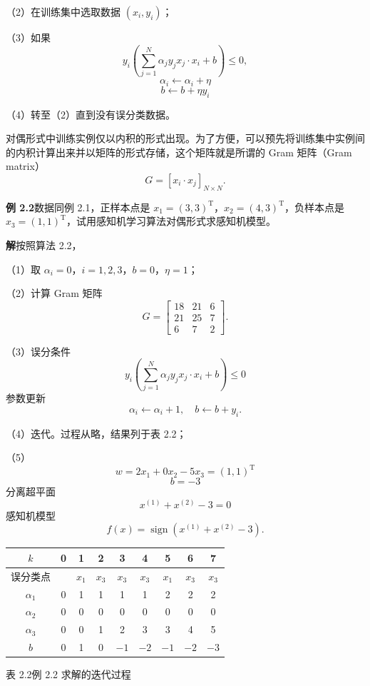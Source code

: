 \documentclass[UTF8, 12pt, fontset=fandol, oneside]{ctexart}
\begin{document}
（2）在训练集中选取数据 $(x_i,y_i)$；

（3）如果
\[
  y_i\left(\sum_{j=1}^N\alpha_jy_jx_j\cdot x_i+b\right)\le 0,
\]
\[
  \alpha_i\leftarrow\alpha_i+\eta
\]
\[
  b\leftarrow b+\eta y_i
\]

（4）转至（2）直到没有误分类数据。

对偶形式中训练实例仅以内积的形式出现。为了方便，可以预先将训练集中实例间的内积计算出来并以矩阵的形式存储，这个矩阵就是所谓的 Gram 矩阵（Gram matrix）
\[
  G=[x_i\cdot x_j]_{N\times N}.
\]

\noindent\textbf{例 2.2}\quad 数据同例 2.1，正样本点是 $x_1=(3,3)^\mathrm{T}$，$x_2=(4,3)^\mathrm{T}$，负样本点是 $x_3=(1,1)^\mathrm{T}$，试用感知机学习算法对偶形式求感知机模型。

\noindent\textbf{解}\quad 按照算法 2.2，

（1）取 $\alpha_i=0$，$i=1,2,3$，$b=0$，$\eta=1$；

（2）计算 Gram 矩阵
\[
  G=
  \begin{bmatrix}
    18 & 21 & 6\\
    21 & 25 & 7\\
    6 & 7 & 2
  \end{bmatrix}.
\]

（3）误分条件
\[
  y_i\left(\sum_{j=1}^N\alpha_jy_jx_j\cdot x_i+b\right)\le 0
\]
参数更新
\[
  \alpha_i\leftarrow\alpha_i+1,\quad b\leftarrow b+y_i.
\]

（4）迭代。过程从略，结果列于表 2.2；

（5）
\[
  w=2x_1+0x_2-5x_3=(1,1)^\mathrm{T}
\]
\[
  b=-3
\]
分离超平面
\[
  x^{(1)}+x^{(2)}-3=0
\]
感知机模型
\[
  f(x)=\operatorname{sign}(x^{(1)}+x^{(2)}-3).
\]

\begin{center}
\begin{tabular}{c c c c c c c c c}
\hline
$k$ & 0 & 1 & 2 & 3 & 4 & 5 & 6 & 7\\
\hline
误分类点 &  & $x_1$ & $x_3$ & $x_3$ & $x_3$ & $x_1$ & $x_3$ & $x_3$\\
$\alpha_1$ & 0 & 1 & 1 & 1 & 1 & 2 & 2 & 2\\
$\alpha_2$ & 0 & 0 & 0 & 0 & 0 & 0 & 0 & 0\\
$\alpha_3$ & 0 & 0 & 1 & 2 & 3 & 3 & 4 & 5\\
$b$ & 0 & 1 & 0 & $-1$ & $-2$ & $-1$ & $-2$ & $-3$\\
\hline
\end{tabular}

表 2.2\quad 例 2.2 求解的迭代过程
\end{center}
\end{document}
